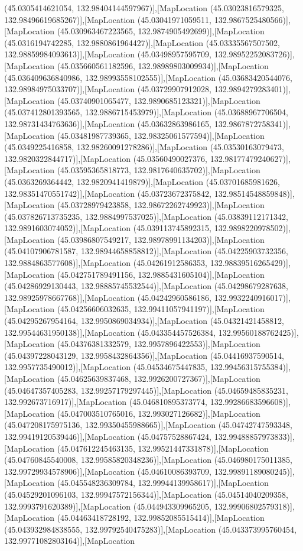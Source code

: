 (45.0305414621054, 132.98404144597967)],[MapLocation (45.03023816579325, 132.98496619685267)],[MapLocation (45.03041971059511, 132.9867525480566)],[MapLocation (45.030963467223565, 132.9874905492699)],[MapLocation (45.0316194742285, 132.9880861964427)],[MapLocation (45.03335567507502, 132.98859984093613)],[MapLocation (45.03498957595709, 132.98952252083726)],[MapLocation (45.035660561182596, 132.98989803009934)],[MapLocation (45.036409636840986, 132.98993558102555)],[MapLocation (45.03683420544076, 132.98984975033707)],[MapLocation (45.03729907912028, 132.9894279283401)],[MapLocation (45.03740901065477, 132.9890685123321)],[MapLocation (45.037412801393565, 132.9886715453979)],[MapLocation (45.03688967706504, 132.98731434763636)],[MapLocation (45.03632863986165, 132.9867872758341)],[MapLocation (45.03481987739365, 132.98325061577594)],[MapLocation (45.0349225416858, 132.98260091278286)],[MapLocation (45.03530163079473, 132.9820322844717)],[MapLocation (45.03560490027376, 132.98177479240627)],[MapLocation (45.03595365818773, 132.9817640635702)],[MapLocation (45.0363269364442, 132.9820941419879)],[MapLocation (45.03701685981626, 132.98351470551742)],[MapLocation (45.03723672375842, 132.98514548859848)],[MapLocation (45.03728979423858, 132.98672262749923)],[MapLocation (45.037826713735235, 132.9884997537025)],[MapLocation (45.03839112171342, 132.9891603074052)],[MapLocation (45.039113745892315, 132.9898220978502)],[MapLocation (45.03986807549217, 132.98978991134203)],[MapLocation (45.04107906781587, 132.98944658858812)],[MapLocation (45.04225903732356, 132.9884863577608)],[MapLocation (45.04261912586353, 132.98839516265429)],[MapLocation (45.042751789491156, 132.9885431605104)],[MapLocation (45.04286929130443, 132.98885745532544)],[MapLocation (45.04298679287638, 132.98925978667768)],[MapLocation (45.04242960586186, 132.9932240916017)],[MapLocation (45.04256606032635, 132.99411057941197)],[MapLocation (45.04295267954164, 132.9950869034934)],[MapLocation (45.04321421458812, 132.99544631950138)],[MapLocation (45.043354457526384, 132.99560188762425)],[MapLocation (45.04376381332579, 132.9957896422553)],[MapLocation (45.04397228043129, 132.9958432864356)],[MapLocation (45.04416937590514, 132.9957735490012)],[MapLocation (45.04534675447835, 132.99456315755384)],[MapLocation (45.04625639837468, 132.9926200727367)],[MapLocation (45.04647357405283, 132.99257179297445)],[MapLocation (45.04659485835231, 132.992673716917)],[MapLocation (45.046810895373774, 132.99286683596608)],[MapLocation (45.047003510765016, 132.993027126682)],[MapLocation (45.047208175975136, 132.99350455988665)],[MapLocation (45.04742747593348, 132.99419120539446)],[MapLocation (45.04757528867424, 132.99488857973833)],[MapLocation (45.047612245463135, 132.99521447331878)],[MapLocation (45.04760845540008, 132.99585820348236)],[MapLocation (45.046980175011385, 132.99729934578906)],[MapLocation (45.04610086393709, 132.99891189080245)],[MapLocation (45.045548236309784, 132.99944139958617)],[MapLocation (45.04529201096103, 132.99947572156344)],[MapLocation (45.04514040209358, 132.9993791620389)],[MapLocation (45.044943309965205, 132.99906802579318)],[MapLocation (45.04463418728192, 132.99852085515414)],[MapLocation (45.043932984838555, 132.99792540475283)],[MapLocation (45.043373995760454, 132.99771082803164)],[MapLocation 